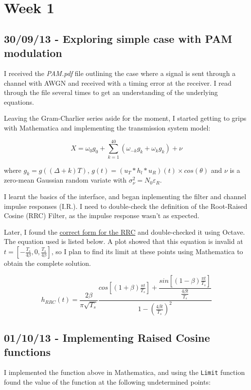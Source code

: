 \section{Week 1}

\subsection{30/09/13 - Exploring simple case with PAM modulation}

I received the \emph{PAM.pdf} file outlining the case where a signal is
sent through a channel with AWGN and received with a timing error at the
receiver. I read through the file several times to get an understanding
of the underlying equations.

Leaving the Gram-Charlier series aside for the moment, I started getting
to grips with Mathematica and implementing the transmission system
model:

\[
X = \omega_0 g_0 + \sum_{k=1}^{40} ( \omega_{-k} g_{k} + \omega_k g_k ) + \nu
\]

where $g_k = g((\Delta + k)T)$,
$g(t) = (u_T \ast h_l \ast u_R)(t) \times cos(\theta)$ and $\nu$ is a
zero-mean Gaussian random variate with
$\sigma_{\nu}^2 = N_0 \varepsilon_R$.

I learnt the basics of the interface, and began inplementing the filter
and channel impulse responses (I.R.). I need to double-check the
definition of the Root-Raised Cosine (RRC) Filter, as the impulse
response wasn't as expected.

Later, I found the
\href{http://ntrs.nasa.gov/archive/nasa/casi.ntrs.nasa.gov/20120008631_2012008365.pdf}{correct
form for the RRC} and double-checked it using Octave. The equation used
is listed below. A plot showed that this equation is invalid at
$t = \left [ - \frac{T_s}{ 4 \beta } , 0 , \frac{T_s}{ 4 \beta } \right ]$,
so I plan to find its limit at these points using Mathematica to obtain
the complete solution.

\[
h_{RRC}(t) = \frac{2 \beta}{\pi \sqrt{T_s}} \frac{cos \left [ (1 + \beta) \frac{\pi t}{T_s} \right ] + \dfrac{sin \left [ (1 - \beta) \frac{\pi t}{T_s} \right ]}{\frac{4 \beta t}{T_s}}}{1 - \left ( \frac{4 \beta t}{T_s} \right )^2}
\]

\subsection{01/10/13 - Implementing Raised Cosine functions}

I implemented the function above in Mathematica, and using the
\texttt{Limit} function found the value of the function at the following
undetermined points:

